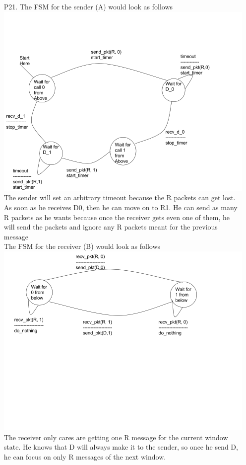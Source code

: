\documentclass[11pt]{article}
\theoremstyle{definition}
\begin{document}
\begin{enumerate}
\item[P21.]
The FSM for the sender (A) would look as follows\\
\includegraphics[scale=0.5]{p21_sender}\\
The sender will set an arbitrary timeout because the R packets can get lost.  As soon as he receives D0, then he can move on to R1.  He can send as many R packets as he wants because once the receiver gets even one of them, he will send the packets and ignore any R packets meant for the previous message\\
The FSM for the receiver (B) would look as follows\\
\includegraphics[scale=0.5]{p21_recv}\\
The receiver only cares are getting one R message for the current window state.  He knows that D will always make it to the sender, so once he send D, he can focus on only R messages of the next window.\\

\end{enumerate}
\end{document}
